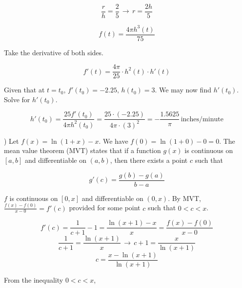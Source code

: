 \documentclass{article}
\begin{document}
\begin{equation*}\frac rh=\frac25\,\rightarrow\,r=\frac{2h}5\end{equation*}

\begin{equation*}f(t)=\frac{4\pi h^3(t)}{75}\end{equation*}

\hfill

\noindent Take the derivative of both sides.

\begin{equation*}f'(t)=\frac{4\pi}{25}\cdot h^2(t)\cdot h'(t)\end{equation*}

\hfill

\noindent Given that at $t=t_0$, $f'(t_0) = -2.25,\,h(t_0) =3$. We may now find $h'(t_0)$. Solve for $h'(t_0)$.

\begin{equation*}h'(t_0)=\frac{25f'(t_0)}{4\pi h^2(t_0)}=\frac{25\cdot(-2.25)}{4\pi\cdot(3)^2}=\boxed{-\frac{1.5625}\pi\,\text{inches/minute}}\end{equation*}

\hfill

) Let $f(x) = \ln(1+x)-x$. We have $f(0) = \ln(1 + 0) - 0 = 0$. The mean value theorem (MVT) states that if a function $g(x)$ is continuous on $[a, b]$ and differentiable on $(a,b)$, then there exists a point $c$ such that

\begin{equation*}
g'(c) = \frac{g(b)-g(a)}{b-a}
\end{equation*}

\hfill

\noindent $f$ is continuous on $[0,x]$ and differentiable on $(0,x)$. By MVT, $\displaystyle\frac{f(x)-f(0)}{x-0}=f'(c)$ provided for some point $c$ such that $0<c<x$.

\begin{equation*}f'(c)=\frac1{c+1}-1=\frac{\ln(x+1) - x}x=\frac{f(x)-f(0)}{x-0}\end{equation*}
\begin{equation*}\frac1{c+1}=\frac{\ln(x+1) }x\,\rightarrow\, c+1 = \frac x{\ln(x+1)}\end{equation*}
\begin{equation*}c=\frac{x-\ln(x+1)}{\ln(x+1)}\end{equation*}

\hfill

\noindent From the inequality $0<c<x$,
\end{document}
